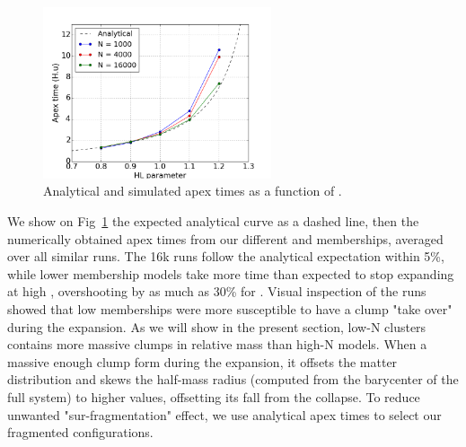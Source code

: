 \begin{figure}
\begin{center}
\includegraphics[width=0.6\textwidth]{Figures/2_apextime_NH.png}
\end{center}
\caption{Analytical and simulated apex times as a function of \tHub.}
\label{Fig:2_apextime_NH}
\end{figure} 

We show on Fig~\ref{Fig:2_apextime_NH} the expected analytical curve as a dashed line, then the numerically obtained apex times from our different \tHub and memberships, averaged over all similar runs. The 16k runs follow the analytical expectation within 5\%, while lower membership models take more time than expected to stop expanding at high \tHub, overshooting by as much as 30\% for . Visual inspection of the runs showed that low memberships were more susceptible to have a clump "take over" during the expansion. As we will show in the present section, low-N clusters contains more massive clumps in relative mass than high-N models. When a massive enough clump form during the expansion, it offsets the matter distribution and skews the half-mass radius (computed from the barycenter of the full system) to higher values, offsetting its fall from the collapse. To reduce unwanted "sur-fragmentation" effect, we use analytical apex times to select our fragmented configurations.  


